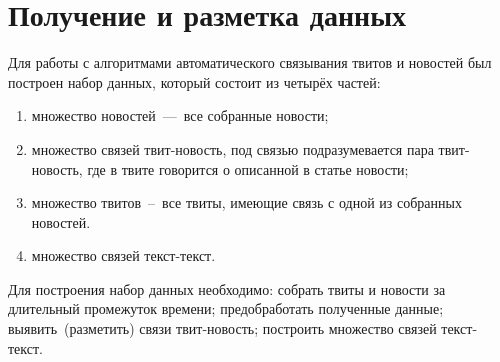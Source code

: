 \section{Получение и разметка данных}
    Для работы с алгоритмами автоматического связывания твитов и новостей был построен набор данных, который состоит из четырёх частей:
    \begin{enumerate}
        \item множество новостей~---~все собранные новости;
        \item множество связей твит-новость, под связью подразумевается пара твит-новость, где в твите говорится о описанной в статье новости;
        \item множество твитов~--~все твиты, имеющие связь с одной из собранных новостей.
        \item множество связей текст-текст.
    \end{enumerate}

    Для построения набор данных необходимо:
    собрать твиты и новости за длительный промежуток времени;
    предобработать полученные данные;
    выявить~(разметить) связи твит-новость;
    построить множество связей текст-текст.

    
    
    
    
    

